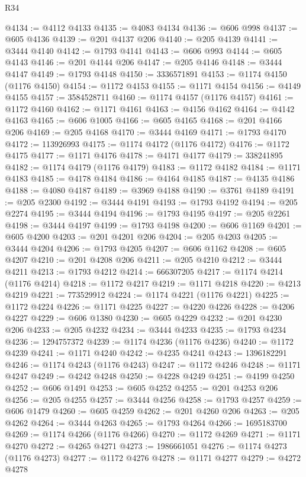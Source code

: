\begin{lexlean}{R34}
\begin{coremodule}
@4134 := @4112 @4133
@4135 := @4083 @4134
@4136 := @606 @998
@4137 := @605 @4136
@4139 := @201 @4137 @206
@4140 := @205 @4139
@4141 := @3444 @4140
@4142 := @1793 @4141
@4143 := @606 @993
@4144 := @605 @4143
@4146 := @201 @4144 @206
@4147 := @205 @4146
@4148 := @3444 @4147
@4149 := @1793 @4148
@4150 := 3336571891
@4153 := @1174 @4150 (@1176 @4150)
@4154 := @1172 @4153
@4155 := @1171 @4154
@4156 := @4149 @4155
@4157 := 3584528711
@4160 := @1174 @4157 (@1176 @4157)
@4161 := @1172 @4160
@4162 := @1171 @4161
@4163 := @4156 @4162
@4164 := @4142 @4163
@4165 := @606 @1005
@4166 := @605 @4165
@4168 := @201 @4166 @206
@4169 := @205 @4168
@4170 := @3444 @4169
@4171 := @1793 @4170
@4172 := 113926993
@4175 := @1174 @4172 (@1176 @4172)
@4176 := @1172 @4175
@4177 := @1171 @4176
@4178 := @4171 @4177
@4179 := 338241895
@4182 := @1174 @4179 (@1176 @4179)
@4183 := @1172 @4182
@4184 := @1171 @4183
@4185 := @4178 @4184
@4186 := @4164 @4185
@4187 := @4135 @4186
@4188 := @4080 @4187
@4189 := @3969 @4188
@4190 := @3761 @4189
@4191 := @205 @2300
@4192 := @3444 @4191
@4193 := @1793 @4192
@4194 := @205 @2274
@4195 := @3444 @4194
@4196 := @1793 @4195
@4197 := @205 @2261
@4198 := @3444 @4197
@4199 := @1793 @4198
@4200 := @606 @1169
@4201 := @605 @4200
@4203 := @201 @4201 @206
@4204 := @205 @4203
@4205 := @3444 @4204
@4206 := @1793 @4205
@4207 := @606 @1162
@4208 := @605 @4207
@4210 := @201 @4208 @206
@4211 := @205 @4210
@4212 := @3444 @4211
@4213 := @1793 @4212
@4214 := 666307205
@4217 := @1174 @4214 (@1176 @4214)
@4218 := @1172 @4217
@4219 := @1171 @4218
@4220 := @4213 @4219
@4221 := 773529912
@4224 := @1174 @4221 (@1176 @4221)
@4225 := @1172 @4224
@4226 := @1171 @4225
@4227 := @4220 @4226
@4228 := @4206 @4227
@4229 := @606 @1380
@4230 := @605 @4229
@4232 := @201 @4230 @206
@4233 := @205 @4232
@4234 := @3444 @4233
@4235 := @1793 @4234
@4236 := 1294757372
@4239 := @1174 @4236 (@1176 @4236)
@4240 := @1172 @4239
@4241 := @1171 @4240
@4242 := @4235 @4241
@4243 := 1396182291
@4246 := @1174 @4243 (@1176 @4243)
@4247 := @1172 @4246
@4248 := @1171 @4247
@4249 := @4242 @4248
@4250 := @4228 @4249
@4251 := @4199 @4250
@4252 := @606 @1491
@4253 := @605 @4252
@4255 := @201 @4253 @206
@4256 := @205 @4255
@4257 := @3444 @4256
@4258 := @1793 @4257
@4259 := @606 @1479
@4260 := @605 @4259
@4262 := @201 @4260 @206
@4263 := @205 @4262
@4264 := @3444 @4263
@4265 := @1793 @4264
@4266 := 1695183700
@4269 := @1174 @4266 (@1176 @4266)
@4270 := @1172 @4269
@4271 := @1171 @4270
@4272 := @4265 @4271
@4273 := 1986661051
@4276 := @1174 @4273 (@1176 @4273)
@4277 := @1172 @4276
@4278 := @1171 @4277
@4279 := @4272 @4278

\end{coremodule}
\end{lexlean}
